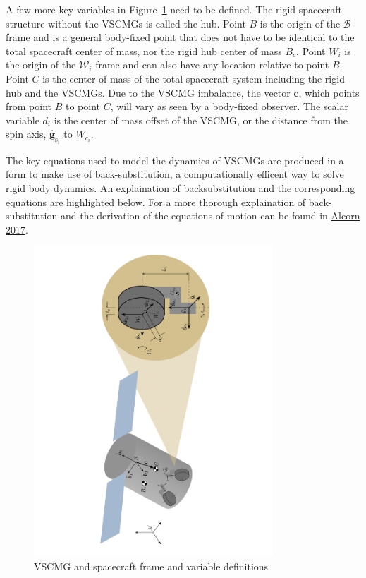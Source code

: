 A few more key variables in Figure~\ref{fig:scplusVSCMG} need to be defined. The rigid spacecraft structure without the VSCMGs is called the hub.  Point $B$ is the origin of the $\mathcal{B}$ frame and is a general body-fixed point that does not have to be identical to the total spacecraft center of mass, nor the rigid hub center of mass $B_{c}$. Point $W_i$ is the origin of the $\mathcal{W}_i$ frame and can also have any location relative to point $B$. Point $C$ is the center of mass of the total spacecraft system including the rigid hub and the VSCMGs. Due to the VSCMG imbalance, the vector $\bm c$, which points from point $B$ to point $C$, will vary as seen by a body-fixed observer. The scalar variable $d_i$ is the center of mass offset of the VSCMG, or the distance from the spin axis, $\hat{\bm g}_{\text{s}_i}$ to $W_{c_i}$.  

The key equations used to model the dynamics of VSCMGs are produced in a form to make use of back-substitution, a computationally efficent way to solve rigid body dynamics. An explaination of backsubstitution and the corresponding equations are highlighted below. For a more thorough explaination of back-substitution and the derivation of the equations of motion can be found in  \href{http://hanspeterschaub.info/Papers/grads/JohnAlcorn.pdf}{Alcorn 2017}\cite{alcorn2017}.

\begin{figure}[htbp]
	\centerline{
		\includegraphics[angle=-90,width=0.8\textwidth]{Figures/scplusVSCMG}}
	\caption{VSCMG and spacecraft frame and variable definitions}
	\label{fig:scplusVSCMG}
\end{figure}

